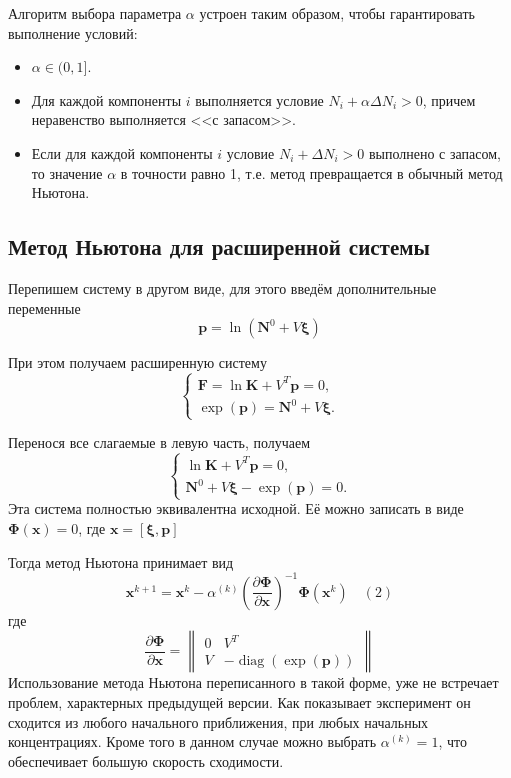 \documentclass[14pt,a4paper]{extarticle}
\newcommand{\pd}[2]{\frac{\partial #1}{\partial #2}}
\newcommand{\diag}{\operatorname{diag}}
\renewcommand{\vec}[1]{\boldsymbol{\mathbf{#1}}}
\begin{document}
Алгоритм выбора параметра $\alpha$ устроен таким образом, чтобы гарантировать выполнение условий:
\begin{itemize}
\item $\alpha \in (0, 1]$.
\item Для каждой компоненты $i$ выполняется условие $N_i + \alpha \Delta N_i > 0$, причем неравенство выполняется <<с запасом>>.
\item Если для каждой компоненты $i$ условие $N_i + \Delta N_i > 0$ выполнено с запасом, то значение $\alpha$ в точности равно 1, т.е. метод превращается в обычный метод Ньютона.
\end{itemize}

\subsection{Метод Ньютона для расширенной системы}

Перепишем систему в другом виде, для этого введём дополнительные переменные $$\vec{p} = \ln{(\vec{N}^0 + V\vec{\xi})}$$ 

При этом получаем расширенную систему
$$\begin{cases} 
	\vec{F} = \ln{\vec{K}} + V^T\vec{p}=0,\\
	\exp(\vec{p})=\vec{N}^0 + V\vec{\xi}.
	
\end{cases}$$

Перенося все слагаемые в левую часть, получаем
$$\begin{cases} 
	\ln{\vec{K}} + V^T\vec{p}=0,\\
	\vec{N}^0 + V\vec{\xi} - \exp(\vec{p}) = 0.
\end{cases}$$
Эта система полностью эквивалентна исходной. Её можно записать в виде
$\vec{\Phi}(\vec{x}) = 0$, где $ \vec{x} = [\vec{\xi}, \vec{p}]$

Тогда метод Ньютона принимает вид\\
$$\vec{x}^{k+1} = \vec{x}^{k} - \alpha^{(k)}\left(\pd{\vec{\Phi}}{\vec{x}}\right)^{-1}\vec{\Phi}(\vec x^k) \quad (2)$$
 где $$\pd{\vec{\Phi}}{\vec{x}} = \begin{Vmatrix}
 0 & V^T \\
 V & -\diag({\exp(\vec{p})})
\end{Vmatrix}  $$
Использование метода Ньютона переписанного в такой форме, уже не встречает проблем, характерных предыдущей версии. Как показывает эксперимент он сходится из любого начального приближения, при любых начальных концентрациях. Кроме того в данном случае можно выбрать $\alpha^{(k)} = 1$, что обеспечивает большую скорость сходимости.
\end{document}
